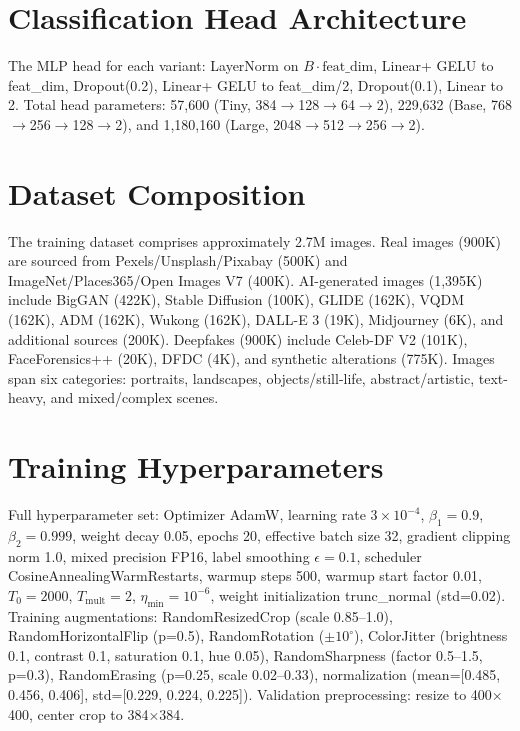 \documentclass[journal]{IEEEtran}
\begin{document}
\section{Classification Head Architecture}
\label{app:head}
The MLP head for each variant: LayerNorm on $B \cdot \text{feat\_dim}$, Linear+ GELU to feat\_dim, Dropout(0.2), Linear+ GELU to feat\_dim/2, Dropout(0.1), Linear to 2. Total head parameters: 57,600 (Tiny, 384$\rightarrow$128$\rightarrow$64$\rightarrow$2), 229,632 (Base, 768$\rightarrow$256$\rightarrow$128$\rightarrow$2), and 1,180,160 (Large, 2048$\rightarrow$512$\rightarrow$256$\rightarrow$2).

\section{Dataset Composition}
\label{app:dataset}
The training dataset comprises approximately 2.7M images. Real images (900K) are sourced from Pexels/Unsplash/Pixabay (500K) and ImageNet/Places365/Open Images V7 (400K). AI-generated images (1,395K) include BigGAN (422K), Stable Diffusion (100K), GLIDE (162K), VQDM (162K), ADM (162K), Wukong (162K), DALL-E 3 (19K), Midjourney (6K), and additional sources (200K). Deepfakes (900K) include Celeb-DF V2 (101K), FaceForensics++ (20K), DFDC (4K), and synthetic alterations (775K). Images span six categories: portraits, landscapes, objects/still-life, abstract/artistic, text-heavy, and mixed/complex scenes.

\section{Training Hyperparameters}
\label{app:hyperparams}
Full hyperparameter set: Optimizer AdamW, learning rate $3\times10^{-4}$, $\beta_1=0.9$, $\beta_2=0.999$, weight decay 0.05, epochs 20, effective batch size 32, gradient clipping norm 1.0, mixed precision FP16, label smoothing $\epsilon=0.1$, scheduler CosineAnnealingWarmRestarts, warmup steps 500, warmup start factor 0.01, $T_0=2000$, $T_{\text{mult}}=2$, $\eta_{\min}=10^{-6}$, weight initialization trunc\_normal (std=0.02). Training augmentations: RandomResizedCrop (scale 0.85--1.0), RandomHorizontalFlip (p=0.5), RandomRotation ($\pm10^\circ$), ColorJitter (brightness 0.1, contrast 0.1, saturation 0.1, hue 0.05), RandomSharpness (factor 0.5--1.5, p=0.3), RandomErasing (p=0.25, scale 0.02--0.33), normalization (mean=[0.485, 0.456, 0.406], std=[0.229, 0.224, 0.225]). Validation preprocessing: resize to 400$\times$400, center crop to 384$\times$384.
\end{document}
